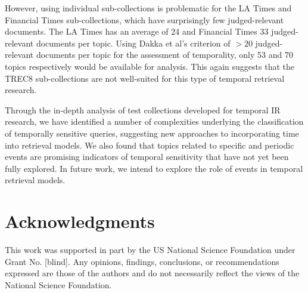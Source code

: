 \documentclass{sig-alternate}
\begin{document}
However, using individual sub-collections is problematic for the LA Times and Financial Times sub-collections, which have surprisingly few judged-relevant documents. The LA Times has an average of 24 and Financial Times 33 judged-relevant documents per topic.  Using Dakka et al's criterion of $>20$ judged-relevant documents per topic for the assessment of temporality, only 53 and 70 topics respectively would be available for analysis. This again suggests that the TREC8 sub-collections are not well-suited for this type of temporal retrieval research.

Through the in-depth analysis of test collections developed for temporal IR research, we have identified a number of complexities underlying the classification of temporally sensitive queries, suggesting new approaches to incorporating time into retrieval models. We also found that topics related to specific and periodic events are promising indicators of temporal sensitivity that have not yet been fully explored.  In future work, we intend to explore the role of events in temporal retrieval models. 

\section{Acknowledgments}
This work was supported in part by the US National Science Foundation under Grant No. [blind]. Any opinions, findings, conclusions, or recommendations expressed are those of the authors and do not necessarily reflect the views of the National Science Foundation. 


  
\end{document}
